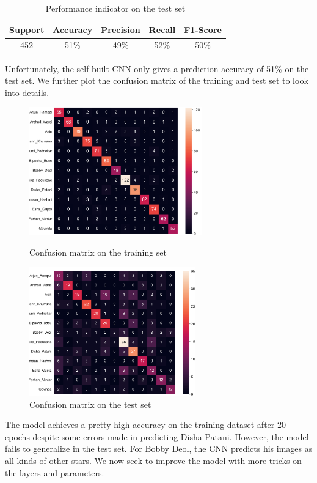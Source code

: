 \begin{table}[!htbp]
    \small
	\centering
	\begin{tabularx}{0.6\textwidth}{ccccc}
		\toprule
		\textbf{Support}
       &  \textbf{Accuracy}
        & \textbf{Precision} 
        & \textbf{Recall} 
        & \textbf{F1-Score} \\

        \midrule
        452
        & 51\%
        & 49\%
        & 52\%
        & 50\%\\
		\bottomrule
	\end{tabularx}%
	\label{tab:result1}%
	\caption{Performance indicator on the test set}
\end{table}%

Unfortunately, the self-built CNN only gives a prediction accuracy of 51\% on the test set. We further plot the confusion matrix of the training and test set to look into details.

\begin{figure}[H]
    \begin{minipage}[t]{0.49\textwidth}
        \centering\includegraphics[width=7.5cm]{./figures/cnn1_confusion_train.png}
        \caption{Confusion matrix on the training set}
        \label{pic:confusion1}
    \end{minipage}
    \qquad
    \begin{minipage}[t]{0.49\textwidth}
        \centering\includegraphics[width=7.2cm]{./figures/cnn1_confusion2.png}
        \caption{Confusion matrix on the test set}
        \label{pic:confusion2}
    \end{minipage}
\end{figure}
The model achieves a pretty high accuracy on the training dataset after 20 epochs despite some errors made in predicting Disha Patani. However, the model fails to generalize in the test set. For Bobby Deol, the CNN predicts his images as all kinds of other stars. We now seek to improve the model with more tricks on the layers and parameters. 

